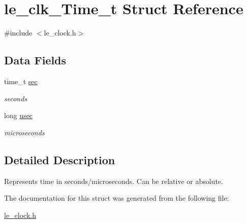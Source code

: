 \hypertarget{structle__clk___time__t}{}\section{le\+\_\+clk\+\_\+\+Time\+\_\+t Struct Reference}
\label{structle__clk___time__t}


{\ttfamily \#include $<$le\+\_\+clock.\+h$>$}

\subsection*{Data Fields}
\begin{DoxyCompactItemize}
\item 
time\+\_\+t \hyperlink{structle__clk___time__t_ae28e527dbd551b3537edc1737611782f}{sec}\hypertarget{structle__clk___time__t_ae28e527dbd551b3537edc1737611782f}{}\label{structle__clk___time__t_ae28e527dbd551b3537edc1737611782f}

\begin{DoxyCompactList}\small\item\em seconds \end{DoxyCompactList}\item 
long \hyperlink{structle__clk___time__t_a8324bdde9199a09a47489a3f246f184c}{usec}\hypertarget{structle__clk___time__t_a8324bdde9199a09a47489a3f246f184c}{}\label{structle__clk___time__t_a8324bdde9199a09a47489a3f246f184c}

\begin{DoxyCompactList}\small\item\em microseconds \end{DoxyCompactList}\end{DoxyCompactItemize}


\subsection{Detailed Description}
Represents time in seconds/microseconds. Can be relative or absolute. 

The documentation for this struct was generated from the following file\+:\begin{DoxyCompactItemize}
\item 
\hyperlink{le__clock_8h}{le\+\_\+clock.\+h}\end{DoxyCompactItemize}
